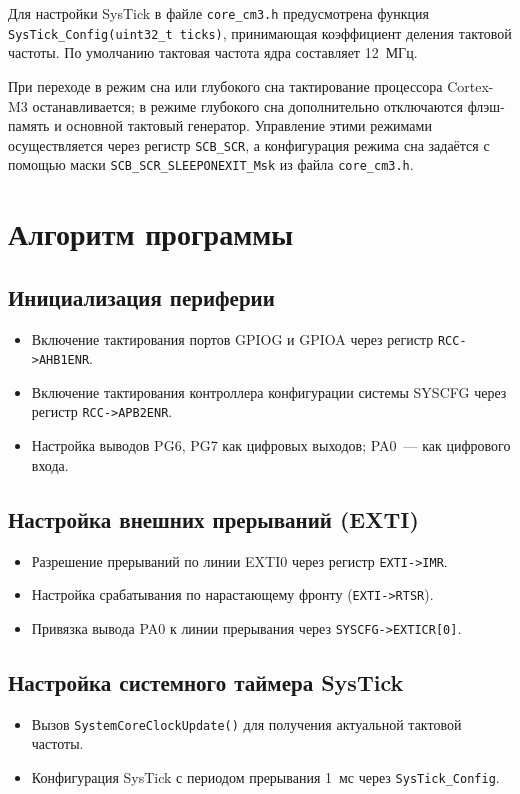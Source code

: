 \documentclass[a4paper, final]{article}
\begin{document}
Для настройки SysTick в файле \texttt{core\_cm3.h} предусмотрена функция \texttt{SysTick\_Config(uint32\_t ticks)}, принимающая коэффициент деления тактовой частоты. По умолчанию тактовая частота ядра составляет 12~МГц.

При переходе в режим сна или глубокого сна тактирование процессора Cortex-M3 останавливается; в режиме глубокого сна дополнительно отключаются флэш-память и основной тактовый генератор. Управление этими режимами осуществляется через регистр \texttt{SCB\_SCR}, а конфигурация режима сна задаётся с помощью маски \texttt{SCB\_SCR\_SLEEPONEXIT\_Msk} из файла \texttt{core\_cm3.h}.

\section{Алгоритм программы}

\subsection{Инициализация периферии}
\begin{itemize}
    \item Включение тактирования портов GPIOG и GPIOA через регистр \texttt{RCC->AHB1ENR}.
    \item Включение тактирования контроллера конфигурации системы SYSCFG через регистр \texttt{RCC->APB2ENR}.
    \item Настройка выводов PG6, PG7 как цифровых выходов; PA0~--- как цифрового входа.
\end{itemize}

\subsection{Настройка внешних прерываний (EXTI)}
\begin{itemize}
    \item Разрешение прерываний по линии EXTI0 через регистр \texttt{EXTI->IMR}.
    \item Настройка срабатывания по нарастающему фронту (\texttt{EXTI->RTSR}).
    \item Привязка вывода PA0 к линии прерывания через \texttt{SYSCFG->EXTICR[0]}.
\end{itemize}

\subsection{Настройка системного таймера SysTick}
\begin{itemize}
    \item Вызов \texttt{SystemCoreClockUpdate()} для получения актуальной тактовой частоты.
    \item Конфигурация SysTick с периодом прерывания 1~мс через \texttt{SysTick\_Config}.
\end{itemize}
\end{document}
